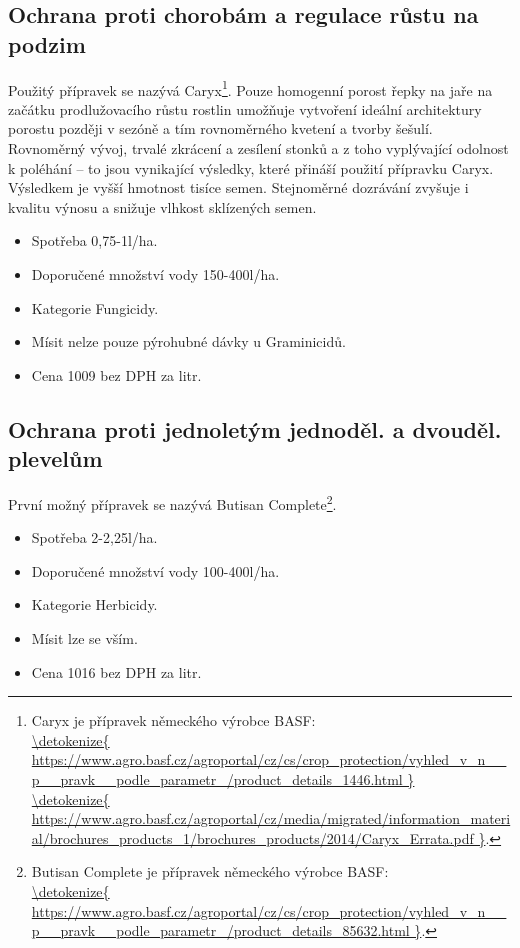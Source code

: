 \subsection{Ochrana proti chorobám a regulace růstu na podzim}
Použitý přípravek se nazývá Caryx\footnote{Caryx je přípravek německého výrobce BASF: \\\url{\detokenize{
https://www.agro.basf.cz/agroportal/cz/cs/crop_protection/vyhled_v_n__p__pravk__podle_parametr_/product_details_1446.html
}}
\\\url{\detokenize{
https://www.agro.basf.cz/agroportal/cz/media/migrated/information_material/brochures_products_1/brochures_products/2014/Caryx_Errata.pdf
}}.}.
Pouze  homogenní  porost  řepky na jaře na začátku prodlužovacího růstu rostlin umožňuje vytvoření  ideální  architektury  porostu 
později v sezóně a tím rovnoměrného kvetení a tvorby šešulí. 
Rovnoměrný  vývoj,  trvalé  zkrácení  a  zesílení  stonků  a  z  toho 
vyplývající odolnost k poléhání – to jsou vynikající výsledky, které přináší použití přípravku Caryx. 
Výsledkem je vyšší hmotnost tisíce semen. Stejnoměrné dozrávání zvyšuje i kvalitu výnosu a snižuje vlhkost sklízených semen.
\begin{itemize}
  \item Spotřeba 0,75-1l/ha.
  \item Doporučené množství vody 150-400l/ha.
  \item Kategorie Fungicidy.
  \item Mísit nelze pouze pýrohubné dávky u Graminicidů.
  \item Cena 1009 bez DPH za litr.
\end{itemize}

\subsection{Ochrana proti jednoletým jednoděl. a dvouděl. plevelům}
První možný přípravek se nazývá Butisan Complete\footnote{Butisan Complete je přípravek německého výrobce BASF: \\\url{\detokenize{
https://www.agro.basf.cz/agroportal/cz/cs/crop_protection/vyhled_v_n__p__pravk__podle_parametr_/product_details_85632.html
}}.}.
\begin{itemize}
  \item Spotřeba 2-2,25l/ha.
  \item Doporučené množství vody 100-400l/ha.
  \item Kategorie Herbicidy.
  \item Mísit lze se vším.
  \item Cena 1016 bez DPH za litr.
\end{itemize}

